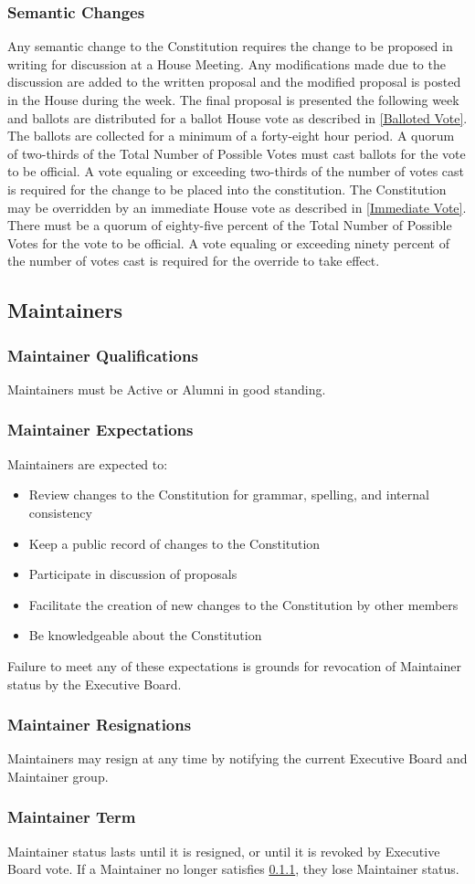 \documentclass{article}
\newcommand{\asection}[1]{\subsection{#1} \label{#1}}
\newcommand{\asubsection}[1]{\subsubsection{#1} \label{#1}}
\begin{document}
\asubsection{Semantic Changes}
Any semantic change to the Constitution requires the change to be proposed in writing for discussion at a House Meeting.
Any modifications made due to the discussion are added to the written proposal and the modified proposal is posted in the House during the week.
The final proposal is presented the following week and ballots are distributed for a ballot House vote as described in \ref{Balloted Vote}.
The ballots are collected for a minimum of a forty-eight hour period.
A quorum of two-thirds of the Total Number of Possible Votes must cast ballots for the vote to be official.
A vote equaling or exceeding two-thirds of the number of votes cast is required for the change to be placed into the constitution.
The Constitution may be overridden by an immediate House vote as described in \ref{Immediate Vote}.
There must be a quorum of eighty-five percent of the Total Number of Possible Votes for the vote to be official.
A vote equaling or exceeding ninety percent of the number of votes cast is required for the override to take effect.

\asection{Maintainers}

\asubsection{Maintainer Qualifications}
Maintainers must be Active or Alumni in good standing.

\asubsection{Maintainer Expectations}
Maintainers are expected to:
\begin{itemize}
	\item Review changes to the Constitution for grammar, spelling, and internal consistency
	\item Keep a public record of changes to the Constitution
	\item Participate in discussion of proposals
	\item Facilitate the creation of new changes to the Constitution by other members
	\item Be knowledgeable about the Constitution
\end{itemize}
Failure to meet any of these expectations is grounds for revocation of Maintainer status by the Executive Board.

\asubsection{Maintainer Resignations}
Maintainers may resign at any time by notifying the current Executive Board and Maintainer group.

\asubsection{Maintainer Term}
Maintainer status lasts until it is resigned, or until it is revoked by Executive Board vote.
If a Maintainer no longer satisfies \ref{Maintainer Qualifications}, they lose Maintainer status.
\end{document}
